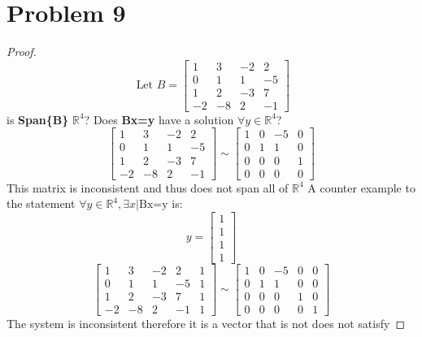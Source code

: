 \documentclass[12pt,a4paper]{article}
\newcommand{\R}{\mathbb{R}}
\begin{document}
\section*{Problem 9}
\begin{proof}
  \[
    \text{ Let }B=\begin{bmatrix}
      1& 3 & -2 & 2 \\
      0 & 1 & 1 & -5\\
       1 & 2 &-3 & 7 \\
       -2 & -8 & 2 & -1
  \end{bmatrix}
  \]
  is \textbf{Span\{B\}} $\R^4$? Does \textbf{Bx=y} have a solution $ \forall y \in \R^4$?
  \[
  \begin{bmatrix}
    1& 3 & -2 & 2 \\
    0 & 1 & 1 & -5\\
     1 & 2 &-3 & 7 \\
     -2 & -8 & 2 & -1
  \end{bmatrix} \sim
  \begin{bmatrix}
    1& 0 & -5 & 0 \\
    0 & 1 & 1 & 0\\
     0 & 0 &0 & 1 \\
     0 & 0 & 0 & 0
  \end{bmatrix}
  \]
  This matrix is inconsistent and thus does not span all of $\R^4$
  A counter example to the statement $\forall y \in \R^4, \exists x | \text{Bx=y}$ is:
  \[
  y=
    \begin{bmatrix}
      1 \\ 1\\ 1 \\ 1
    \end{bmatrix}
  \]
  \[
  \begin{bmatrix}
    1& 3 & -2 & 2 &1\\
    0 & 1 & 1 & -5&1\\
     1 & 2 &-3 & 7 &1\\
     -2 & -8 & 2 & -1 &1
  \end{bmatrix} \sim
  \begin{bmatrix}
    1& 0 & -5 & 0 &0\\
    0 & 1 & 1 & 0&0\\
    0 & 0 &0 & 1 &0\\
    0 & 0 & 0 & 0 &1
  \end{bmatrix}
  \]
  The system is inconsistent therefore it is a vector that is not does not satisfy 
\end{proof}
\end{document}
